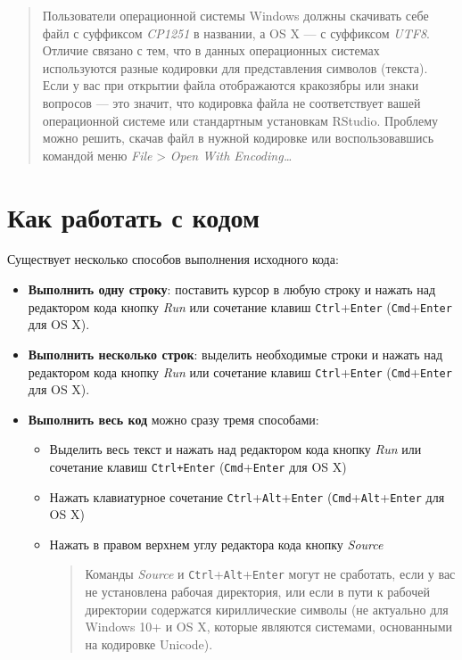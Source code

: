 \documentclass[]{book}
\providecommand{\tightlist}{%
  \setlength{\itemsep}{0pt}\setlength{\parskip}{0pt}}
\begin{document}
\begin{quote}
Пользователи операционной системы Windows должны скачивать себе файл с
суффиксом \emph{CP1251} в названии, а OS X --- с суффиксом \emph{UTF8}.
Отличие связано с тем, что в данных операционных системах используются
разные кодировки для представления символов (текста). Если у вас при
открытии файла отображаются кракозябры или знаки вопросов --- это
значит, что кодировка файла не соответствует вашей операционной системе
или стандартным установкам RStudio. Проблему можно решить, скачав файл в
нужной кодировке или воспользовавшись командой меню \emph{File}
\textgreater{} \emph{Open With Encoding\ldots{}}
\end{quote}

\section*{Как работать с кодом}\label{---}

Существует несколько способов выполнения исходного кода:

\begin{itemize}
\tightlist
\item
  \textbf{Выполнить одну строку}: поставить курсор в любую строку и
  нажать над редактором кода кнопку \emph{Run} или сочетание клавиш
  \texttt{Ctrl}+\texttt{Enter} (\texttt{Cmd}+\texttt{Enter} для OS X).
\item
  \textbf{Выполнить несколько строк}: выделить необходимые строки и
  нажать над редактором кода кнопку \emph{Run} или сочетание клавиш
  \texttt{Ctrl}+\texttt{Enter} (\texttt{Cmd}+\texttt{Enter} для OS X).
\item
  \textbf{Выполнить весь код} можно сразу тремя способами:

  \begin{itemize}
  \item
    Выделить весь текст и нажать над редактором кода кнопку \emph{Run}
    или сочетание клавиш \texttt{Ctrl+Enter}
    (\texttt{Cmd}+\texttt{Enter} для OS X)
  \item
    Нажать клавиатурное сочетание
    \texttt{Ctrl}+\texttt{Alt}+\texttt{Enter}
    (\texttt{Cmd}+\texttt{Alt}+\texttt{Enter} для OS X)
  \item
    Нажать в правом верхнем углу редактора кода кнопку \emph{Source}

    \begin{quote}
    Команды \emph{Source} и \texttt{Ctrl}+\texttt{Alt}+\texttt{Enter}
    могут не сработать, если у вас не установлена рабочая директория,
    или если в пути к рабочей директории содержатся кириллические
    символы (не актуально для Windows 10+ и OS X, которые являются
    системами, основанными на кодировке Unicode).
    \end{quote}
  \end{itemize}
\end{itemize}
\end{document}
